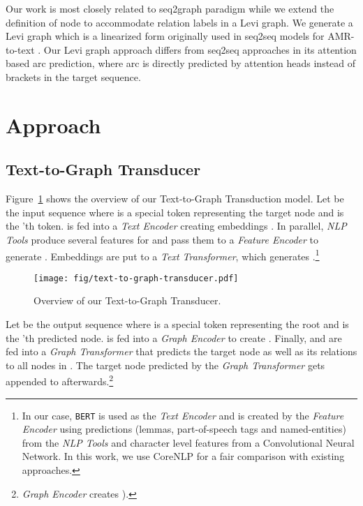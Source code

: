 \documentclass[11pt,a4paper]{article}
\begin{document}
Our work is most closely related to seq2graph paradigm while we extend the definition of node to accommodate relation labels in a Levi graph. We generate a Levi graph which is a linearized form originally used in seq2seq models for AMR-to-text \cite{beck-etal-2018-graph, guo-etal-2019-densely, ribeiro-etal-2019-enhancing}. Our Levi graph approach differs from seq2seq approaches in its attention based arc prediction, where arc is directly predicted by attention heads instead of brackets in the target sequence. \section{Approach}
\label{sec:approach}





\subsection{Text-to-Graph Transducer}
\label{ssec:text-to-graph-transducer}

\noindent Figure~\ref{fig:text-to-graph-transducer} shows the overview of our Text-to-Graph Transduction model.
Let  be the input sequence where  is a special token representing 
the target node and  is the 'th token.
 is fed into a \textit{Text Encoder} creating embeddings .
In parallel, \textit{NLP Tools} produce several features for  and pass them to a \textit{Feature Encoder} to generate .
Embeddings  are put to a \textit{Text Transformer}, which generates .\footnote{In our case, \texttt{BERT} \cite{devlin-etal-2019-bert} is used as the \textit{Text Encoder} and  is created by the \textit{Feature Encoder} using predictions (lemmas, part-of-speech tags and named-entities) from the \textit{NLP Tools} and character level features from a Convolutional Neural Network. In this work, we use CoreNLP \cite{manning2014stanford} for a fair comparison with existing approaches.}

\begin{figure}[htbp!]
\centering
\texttt{[image: fig/text-to-graph-transducer.pdf]}
\caption{Overview of our Text-to-Graph Transducer.}
\label{fig:text-to-graph-transducer}
\end{figure}

\noindent Let  be the output sequence where  is a special token representing the root and  is the 'th predicted node.
 is fed into a \textit{Graph Encoder} to create .
Finally,  and  are fed into a \textit{Graph Transformer} that predicts the target node as well as its relations to all nodes in .
The target node predicted by the \textit{Graph Transformer} gets appended to  afterwards.\footnote{\textit{Graph Encoder} creates ).}
\end{document}

